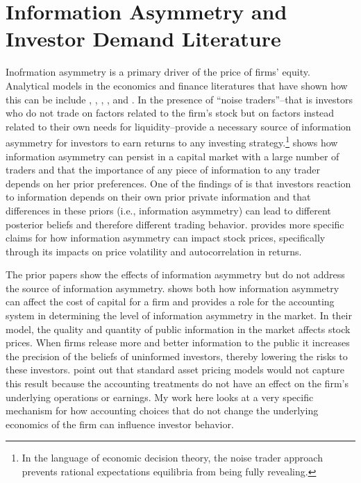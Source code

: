 \documentclass[thesis]{thesis-umich}
\begin{document}
\section{Information Asymmetry and Investor Demand Literature}\label{sec:infoasymm}
Inofrmation asymmetry is a primary driver of the price of firms' equity. Analytical models in the economics and finance literatures that have shown how this can be include \cite{grossmanstiglitz1980}, \cite{hellwig1980}, \cite{admati1985}, \cite{wang1993}, and \cite{easleyohara2004}. In \cite{grossmanstiglitz1980} the presence of ``noise traders''--that is investors who do not trade on factors related to the firm's stock but on factors instead related to their own needs for liquidity--provide a necessary source of information asymmetry for investors to earn returns to any investing strategy.\footnote{In the language of economic decision theory, the noise trader approach prevents rational expectations equilibria from being fully revealing.} \cite{hellwig1980} shows how information asymmetry can persist in a capital market with a large number of traders and that the importance of any piece of information to any trader depends on her prior preferences. One of the findings of \cite{admati1985} is that investors reaction to information depends on their own prior private information and that differences in these priors (i.e., information asymmetry) can lead to different posterior beliefs and therefore different trading behavior. \cite{wang1993} provides more specific claims for how information asymmetry can impact stock prices, specifically through its impacts on price volatility and autocorrelation in returns. 

The prior papers show the effects of information asymmetry but do not address the source of information asymmetry. \cite{easleyohara2004} shows both how information asymmetry can affect the cost of capital for a firm and provides a role for the accounting system in determining the level of information asymmetry in the market. In their model, the quality and quantity of public information in the market affects stock prices. When firms release more and better information to the public it increases the precision of the beliefs of uninformed investors, thereby lowering the risks to these investors. \cite{easleyohara2004} point out that standard asset pricing models would not capture this result because the accounting treatments do not have an effect on the firm's underlying operations or earnings. My work here looks at a very specific mechanism for how accounting choices that do not change the underlying economics of the firm can influence investor behavior.
\end{document}
